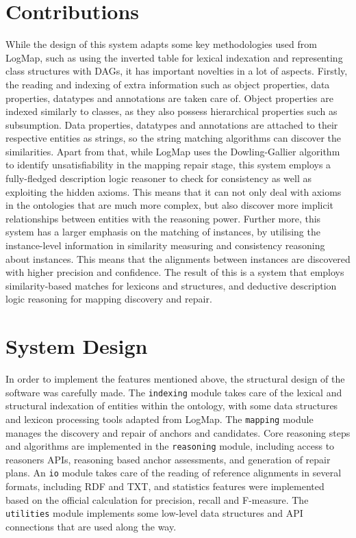 \section{Contributions}

While the design of this system adapts some key methodologies used from LogMap, such as using the inverted table for lexical indexation and representing class structures with DAGs, it has important novelties in a lot of aspects. Firstly, the reading and indexing of extra information such as object properties, data properties, datatypes and annotations are taken care of. Object properties are indexed similarly to classes, as they also possess hierarchical properties such as subsumption. Data properties, datatypes and annotations are attached to their respective entities as strings, so the string matching algorithms can discover the similarities. Apart from that, while LogMap uses the Dowling-Gallier algorithm \cite{DBLP:journals/jlp/DowlingG84} to identify unsatisfiability in the mapping repair stage, this system employs a fully-fledged description logic reasoner to check for consistency as well as exploiting the hidden axioms. This means that it can not only deal with axioms in the ontologies that are much more complex, but also discover more implicit relationships between entities with the reasoning power. Further more, this system has a larger emphasis on the matching of instances, by utilising the instance-level information in similarity measuring and consistency reasoning about instances. This means that the alignments between instances are discovered with higher precision and confidence. The result of this is a system that employs similarity-based matches for lexicons and structures, and deductive description logic reasoning for mapping discovery and repair.

\section{System Design}

In order to implement the features mentioned above, the structural design of the software was carefully made. The \texttt{indexing} module takes care of the lexical and structural indexation of entities within the ontology, with some data structures and lexicon processing tools adapted from LogMap. The \texttt{mapping} module manages the discovery and repair of anchors and candidates. Core reasoning steps and algorithms are implemented in the \texttt{reasoning} module, including access to reasoners APIs, reasoning based anchor assessments, and generation of repair plans. An \texttt{io} module takes care of the reading of reference alignments in several formats, including RDF and TXT, and statistics features were implemented based on the official calculation for precision, recall and F-measure. The \texttt{utilities} module implements some low-level data structures and API connections that are used along the way.


